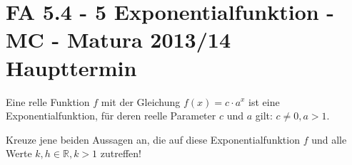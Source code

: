 \section{FA 5.4 - 5 Exponentialfunktion - MC - Matura 2013/14 Haupttermin}

\begin{beispiel}{1} %
			Eine relle Funktion $f$ mit der Gleichung $f(x)=c\cdot a^x$ ist eine Exponentialfunktion, für deren reelle Parameter $c$ und $a$ gilt: $c\neq 0,a>1$.
			
			Kreuze jene beiden Aussagen an, die auf diese Exponentialfunktion $f$ und alle Werte $k,h\in\mathbb{R},k>1$ zutreffen!\leer
			
\end{beispiel}